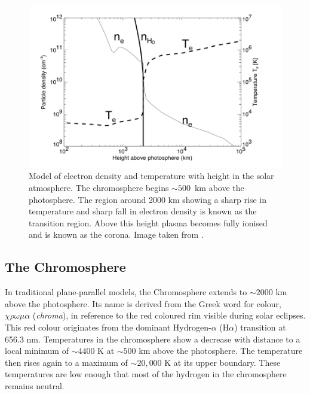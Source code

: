 \begin{figure}[ht]
    \centering
    \includegraphics[width=\columnwidth]{Images/Corona_temp.png}
    \caption[Model of electron density and temperature with height in the solar atmosphere.]{Model of electron density and temperature with height in the solar atmosphere. The chromosphere begins $\sim 500$~km above the photosphere. The region around 2000 km showing a sharp rise in temperature and sharp fall in electron density is known as the transition region. Above this height plasma becomes fully ionised and is known as the corona. Image taken from \cite{Aschwanden2004}.}
    \label{fig:corona_temp}
\end{figure}

\subsection{The Chromosphere}
In traditional plane-parallel models, the Chromosphere extends to $\sim 2000$ km above the photosphere. Its name is derived from the Greek word for colour, $\chi \rho \omega \mu \alpha$ (\textit{chroma}), in reference to the red coloured rim visible during solar eclipses. This red colour originates from the dominant Hydrogen-$\alpha$ (H$\alpha$) transition at 656.3 nm. Temperatures in the chromosphere show a decrease with distance to a local minimum of $\sim 4400$ K at $\sim 500$ km above the photosphere. The temperature then rises again to a maximum of $\sim 20,000$ K at its upper boundary. These temperatures are low enough that most of the hydrogen in the chromosphere remains neutral. 

